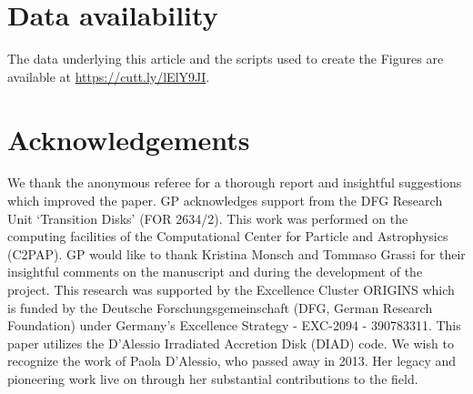 \documentclass[usenatbib,useAMS,usedcolumn]{mnras}
\begin{document}
\section{Data availability}
   The data underlying this article and the scripts used to create the Figures are available at \href{https://cutt.ly/lElY9JI}{https://cutt.ly/lElY9JI}.

\section*{Acknowledgements}

    We thank the anonymous referee for a thorough report and insightful suggestions which improved the paper.
    GP acknowledges support from the DFG Research Unit ‘Transition Disks’ (FOR 2634/2).
    This work was performed on the computing facilities of the Computational Center for Particle and Astrophysics (C2PAP).
    GP would like to thank Kristina Monsch and Tommaso Grassi for their insightful comments on the manuscript and during the development of the project.
    This research was supported by the Excellence Cluster ORIGINS which is funded by the Deutsche Forschungsgemeinschaft (DFG, German Research Foundation) under Germany's Excellence Strategy - EXC-2094 - 390783311.
    This paper utilizes the D’Alessio Irradiated Accretion Disk (DIAD) code. We wish to recognize the work of Paola D’Alessio, who passed away in 2013. Her legacy and pioneering work live on through her substantial contributions to the field.




\bsp	%
\label{lastpage}
\end{document}

